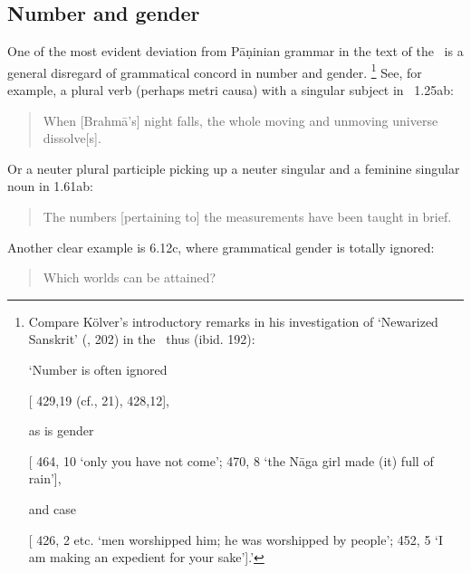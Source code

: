 \subsection{Number and gender}\label{number}
One of the most evident deviation from Pāṇinian grammar in 
the text of the \VSS\ is a general disregard of grammatical concord 
in number and gender.%
	\footnote{Compare Kölver's introductory remarks in his investigation of
	`Newarized Sanskrit' (\citeyear{KolverErgative}, 202) in the \SvayP\ thus (ibid. 192):
					
					\noindent
	          	`Number is often ignored
	          	
					[ 429,19 (cf., 21), 
					 428,12],
					
					\noindent
					as is gender
					
			[ 464, 10 `only you have not come’; 
			 470, 8 
					`the Nāga girl made (it) full of rain'],
				
				\noindent
				and case
				
				[ 426, 2 etc. 
				`men worshipped him; he was worshipped by people'; 
				 452, 5 
				`I am making an expedient for your sake'].'}
See, for example, a plural verb
(perhaps metri causa) with a singular subject in \VSS\ 1.25ab:

\begin{quote}

When [Brahmā's] night falls, the whole moving and unmoving universe dissolve[s].
\end{quote}

\noindent
Or a neuter plural participle picking up a 
neuter singular and a feminine singular noun in 1.61ab:

\begin{quote}

The numbers [pertaining to] the measurements have been taught in brief.
\end{quote}

\noindent
Another clear example is 6.12c, where grammatical gender
is totally ignored: 

\begin{quote}

Which worlds can be attained?
\end{quote}

